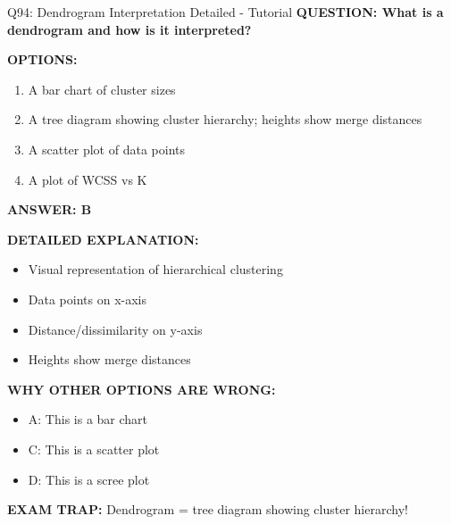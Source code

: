\documentclass[8pt]{beamer}
\begin{document}
	\begin{frame}{Q94: Dendrogram Interpretation Detailed - Tutorial}
		\fontsize{6.5}{7.5}\selectfont
		\textbf{QUESTION: What is a dendrogram and how is it interpreted?}
		
		\vspace{0.1cm}
		\textbf{OPTIONS:}
		\begin{enumerate}
			\item A bar chart of cluster sizes
			\item A tree diagram showing cluster hierarchy; heights show merge distances
			\item A scatter plot of data points
			\item A plot of WCSS vs K
		\end{enumerate}
		
		\vspace{0.1cm}
		\textcolor{myblue}{\textbf{ANSWER: B}}
		
		\vspace{0.1cm}
		\textbf{DETAILED EXPLANATION:}
		\begin{itemize}
			\item Visual representation of hierarchical clustering
			\item Data points on x-axis
			\item Distance/dissimilarity on y-axis
			\item Heights show merge distances
		\end{itemize}
		
		\vspace{0.1cm}
		\textcolor{myred}{\textbf{WHY OTHER OPTIONS ARE WRONG:}}
		\begin{itemize}
			\item \textcolor{myred}{A:} This is a bar chart
			\item \textcolor{myred}{C:} This is a scatter plot
			\item \textcolor{myred}{D:} This is a scree plot
		\end{itemize}
		
		\textcolor{myred}{\textbf{EXAM TRAP:}} Dendrogram = \textcolor{myblue}{tree diagram showing cluster hierarchy}!
	\end{frame}
	
\end{document}
